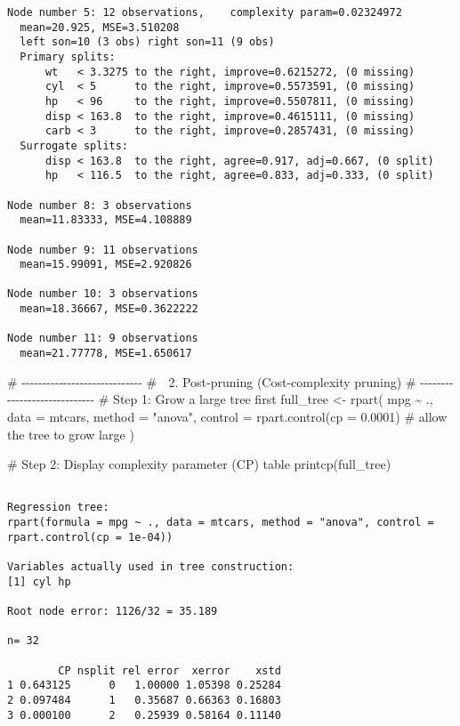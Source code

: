 \documentclass[
  letterpaper,
  DIV=11,
  numbers=noendperiod]{scrreprt}
\newenvironment{Shaded}{\begin{snugshade}}{\end{snugshade}}
\newcommand{\AttributeTok}[1]{\textcolor[rgb]{0.40,0.45,0.13}{#1}}
\newcommand{\CommentTok}[1]{\textcolor[rgb]{0.37,0.37,0.37}{#1}}
\newcommand{\FloatTok}[1]{\textcolor[rgb]{0.68,0.00,0.00}{#1}}
\newcommand{\FunctionTok}[1]{\textcolor[rgb]{0.28,0.35,0.67}{#1}}
\newcommand{\NormalTok}[1]{\textcolor[rgb]{0.00,0.23,0.31}{#1}}
\newcommand{\OtherTok}[1]{\textcolor[rgb]{0.00,0.23,0.31}{#1}}
\newcommand{\SpecialCharTok}[1]{\textcolor[rgb]{0.37,0.37,0.37}{#1}}
\newcommand{\StringTok}[1]{\textcolor[rgb]{0.13,0.47,0.30}{#1}}
\begin{document}
\begin{verbatim}
Node number 5: 12 observations,    complexity param=0.02324972
  mean=20.925, MSE=3.510208 
  left son=10 (3 obs) right son=11 (9 obs)
  Primary splits:
      wt   < 3.3275 to the right, improve=0.6215272, (0 missing)
      cyl  < 5      to the right, improve=0.5573591, (0 missing)
      hp   < 96     to the right, improve=0.5507811, (0 missing)
      disp < 163.8  to the right, improve=0.4615111, (0 missing)
      carb < 3      to the right, improve=0.2857431, (0 missing)
  Surrogate splits:
      disp < 163.8  to the right, agree=0.917, adj=0.667, (0 split)
      hp   < 116.5  to the right, agree=0.833, adj=0.333, (0 split)

Node number 8: 3 observations
  mean=11.83333, MSE=4.108889 

Node number 9: 11 observations
  mean=15.99091, MSE=2.920826 

Node number 10: 3 observations
  mean=18.36667, MSE=0.3622222 

Node number 11: 9 observations
  mean=21.77778, MSE=1.650617 
\end{verbatim}

\begin{Shaded}
\begin{Highlighting}[]
\CommentTok{\# {-}{-}{-}{-}{-}{-}{-}{-}{-}{-}{-}{-}{-}{-}{-}{-}{-}{-}{-}{-}{-}{-}{-}{-}{-}{-}{-}{-}{-}}
\CommentTok{\# 🌳 2. Post{-}pruning (Cost{-}complexity pruning)}
\CommentTok{\# {-}{-}{-}{-}{-}{-}{-}{-}{-}{-}{-}{-}{-}{-}{-}{-}{-}{-}{-}{-}{-}{-}{-}{-}{-}{-}{-}{-}{-}}
\CommentTok{\# Step 1: Grow a large tree first}
\NormalTok{full\_tree }\OtherTok{\textless{}{-}} \FunctionTok{rpart}\NormalTok{(}
\NormalTok{  mpg }\SpecialCharTok{\textasciitilde{}}\NormalTok{ ., }
  \AttributeTok{data =}\NormalTok{ mtcars,}
  \AttributeTok{method =} \StringTok{"anova"}\NormalTok{,}
  \AttributeTok{control =} \FunctionTok{rpart.control}\NormalTok{(}\AttributeTok{cp =} \FloatTok{0.0001}\NormalTok{)  }\CommentTok{\# allow the tree to grow large}
\NormalTok{)}

\CommentTok{\# Step 2: Display complexity parameter (CP) table}
\FunctionTok{printcp}\NormalTok{(full\_tree)}
\end{Highlighting}
\end{Shaded}

\begin{verbatim}

Regression tree:
rpart(formula = mpg ~ ., data = mtcars, method = "anova", control = rpart.control(cp = 1e-04))

Variables actually used in tree construction:
[1] cyl hp 

Root node error: 1126/32 = 35.189

n= 32 

        CP nsplit rel error  xerror    xstd
1 0.643125      0   1.00000 1.05398 0.25284
2 0.097484      1   0.35687 0.66363 0.16803
3 0.000100      2   0.25939 0.58164 0.11140
\end{verbatim}
\end{document}
